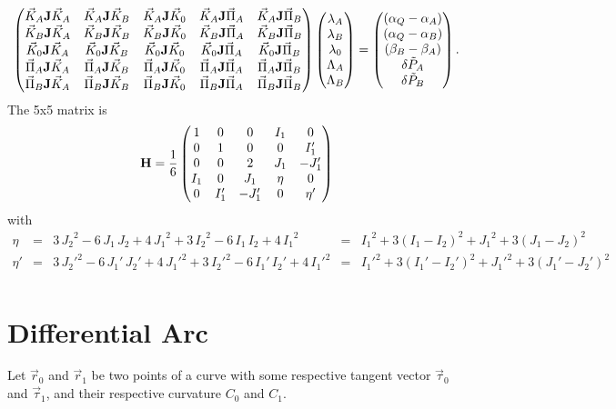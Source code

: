 \documentclass[11pt]{amsart}
\newcommand{\mymat}[1]{\mathbf{#1}}
\begin{document}
\[
	\begin{pmatrix}
		\vec{K}_A\mymat{J}\vec{K}_A&\vec{K}_A\mymat{J}\vec{K}_B&\vec{K}_A\mymat{J}\vec{K}_0&\vec{K}_A\mymat{J}\vec{\Pi}_A&\vec{K}_A\mymat{J}\vec{\Pi}_B\cr
		\vec{K}_B\mymat{J}\vec{K}_A&\vec{K}_B\mymat{J}\vec{K}_B&\vec{K}_B\mymat{J}\vec{K}_0&\vec{K}_B\mymat{J}\vec{\Pi}_A&\vec{K}_B\mymat{J}\vec{\Pi}_B\cr
		\vec{K}_0\mymat{J}\vec{K}_A&\vec{K}_0\mymat{J}\vec{K}_B&\vec{K}_0\mymat{J}\vec{K}_0&\vec{K}_0\mymat{J}\vec{\Pi}_A&\vec{K}_0\mymat{J}\vec{\Pi}_B\cr
		\vec{\Pi}_A\mymat{J}\vec{K}_A&\vec{\Pi}_A\mymat{J}\vec{K}_B&\vec{\Pi}_A\mymat{J}\vec{K}_0&\vec{\Pi}_A\mymat{J}\vec{\Pi}_A&\vec{\Pi}_A\mymat{J}\vec{\Pi}_B\cr
		\vec{\Pi}_B\mymat{J}\vec{K}_A&\vec{\Pi}_B\mymat{J}\vec{K}_B&\vec{\Pi}_B\mymat{J}\vec{K}_0&\vec{\Pi}_B\mymat{J}\vec{\Pi}_A&\vec{\Pi}_B\mymat{J}\vec{\Pi}_B\cr
	\end{pmatrix}
	\begin{pmatrix}
	\lambda_A\cr
	\lambda_B\cr
	\lambda_0\cr
	\Lambda_A\cr
	\Lambda_B\cr
	\end{pmatrix}
	=
	\begin{pmatrix}
		(\alpha_Q-\alpha_A)\cr
		(\alpha_Q-\alpha_B)\cr
	 	(\beta_B-\beta_A)\cr
	 	\delta\tilde{P}_A\cr
	 	\delta\tilde{P}_B\cr
	\end{pmatrix}.
\]
The 5x5 matrix is
\[ \mymat{H} = \dfrac{1}{6}
\begin{pmatrix}
1 & 0 & 0 & I_1 & 0\cr 
0 & 1 & 0 & 0 & I_1'\cr
0 & 0 & 2 & J_1 & -J_1'\cr
I_1 & 0 & J_1 &  \eta & 0\cr
0 & I_1' & -J_1' & 0 & \eta'
\end{pmatrix}
\]
with
\[
	\begin{array}{rclcl}
		\eta & = & 3\,{J_2}^{2}-6\,J_1\,J_2+4\,{J_1}^{2}+3\,{I_2}^{2}-6\,I_1\,I_2+4\,{I_1}^{2} & = & 
		{I_1}^2+3(I_1-I_2)^2 + {J_1}^2 + 3 (J_1-J_2)^2\\
		\eta' & = & 3\,{J_2'}^{2}-6\,J_1'\,J_2'+4\,{J_1'}^{2}+3\,{I_2'}^{2}-6\,I_1'\,I_2'+4\,{I_1'}^{2} & = & {I_1'}^2+3(I_1'-I_2')^2 + {J_1'}^2 + 3 (J_1'-J_2')^2\\
	\end{array}
\]
\section{Differential Arc}
Let $\vec{r}_0$ and $\vec{r}_1$ be two points of a curve
with some respective tangent vector $\vec{\tau}_0$ and $\vec{\tau}_1$, and their
respective curvature $C_0$ and $C_1$.
\end{document}
